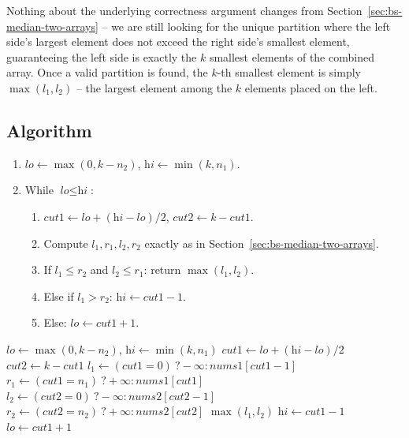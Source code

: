 Nothing about the underlying correctness argument changes from
Section~\ref{sec:bs-median-two-arrays} -- we are still looking for the
unique partition where the left side's largest element does not exceed
the right side's smallest element, guaranteeing the left side is exactly
the $k$ smallest elements of the combined array. Once a valid partition is
found, the $k$-th smallest element is simply $\max(l_1, l_2)$ -- the
largest element among the $k$ elements placed on the left.

\subsection*{Algorithm}

\begin{enumerate}
  \item $\textit{lo} \gets \max(0, k-n_2)$,
        $\textit{hi} \gets \min(k, n_1)$.
  \item While $\textit{lo} \le \textit{hi}$:
  \begin{enumerate}
    \item $\textit{cut1} \gets \textit{lo}+(\textit{hi}-\textit{lo})/2$,
          $\textit{cut2} \gets k-\textit{cut1}$.
    \item Compute $l_1, r_1, l_2, r_2$ exactly as in
          Section~\ref{sec:bs-median-two-arrays}.
    \item If $l_1 \le r_2$ and $l_2 \le r_1$: return $\max(l_1,l_2)$.
    \item Else if $l_1 > r_2$: $\textit{hi} \gets \textit{cut1}-1$.
    \item Else: $\textit{lo} \gets \textit{cut1}+1$.
  \end{enumerate}
\end{enumerate}

\begin{algorithm}[H]
\caption{Kth Element of Two Sorted Arrays}
\begin{algorithmic}[1]
  \State $\textit{lo} \gets \max(0, k-n_2)$, $\textit{hi} \gets \min(k, n_1)$
    \State $\textit{cut1} \gets \textit{lo}+(\textit{hi}-\textit{lo})/2$
    \State $\textit{cut2} \gets k - \textit{cut1}$
    \State $l_1 \gets (\textit{cut1}=0)\ ? -\infty : \textit{nums1}[\textit{cut1}-1]$
    \State $r_1 \gets (\textit{cut1}=n_1)\ ? +\infty : \textit{nums1}[\textit{cut1}]$
    \State $l_2 \gets (\textit{cut2}=0)\ ? -\infty : \textit{nums2}[\textit{cut2}-1]$
    \State $r_2 \gets (\textit{cut2}=n_2)\ ? +\infty : \textit{nums2}[\textit{cut2}]$
      \State \Return $\max(l_1, l_2)$
      \State $\textit{hi} \gets \textit{cut1} - 1$
    \Else
      \State $\textit{lo} \gets \textit{cut1} + 1$
    \EndIf
  \EndWhile
\EndProcedure
\end{algorithmic}
\end{algorithm}

